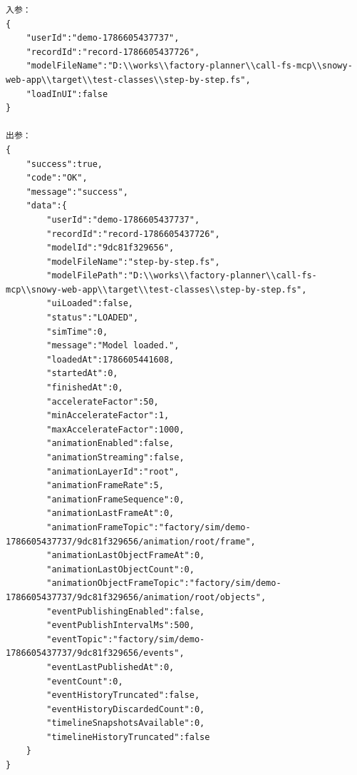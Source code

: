 {\scriptsize
\begin{verbatim}
入参：
{
	"userId":"demo-1786605437737",
	"recordId":"record-1786605437726",
	"modelFileName":"D:\\works\\factory-planner\\call-fs-mcp\\snowy-web-app\\target\\test-classes\\step-by-step.fs",
	"loadInUI":false
}    

出参：
{
	"success":true,
	"code":"OK",
	"message":"success",
	"data":{
		"userId":"demo-1786605437737",
		"recordId":"record-1786605437726",
		"modelId":"9dc81f329656",
		"modelFileName":"step-by-step.fs",
		"modelFilePath":"D:\\works\\factory-planner\\call-fs-mcp\\snowy-web-app\\target\\test-classes\\step-by-step.fs",
		"uiLoaded":false,
		"status":"LOADED",
		"simTime":0,
		"message":"Model loaded.",
		"loadedAt":1786605441608,
		"startedAt":0,
		"finishedAt":0,
		"accelerateFactor":50,
		"minAccelerateFactor":1,
		"maxAccelerateFactor":1000,
		"animationEnabled":false,
		"animationStreaming":false,
		"animationLayerId":"root",
		"animationFrameRate":5,
		"animationFrameSequence":0,
		"animationLastFrameAt":0,
		"animationFrameTopic":"factory/sim/demo-1786605437737/9dc81f329656/animation/root/frame",
		"animationLastObjectFrameAt":0,
		"animationLastObjectCount":0,
		"animationObjectFrameTopic":"factory/sim/demo-1786605437737/9dc81f329656/animation/root/objects",
		"eventPublishingEnabled":false,
		"eventPublishIntervalMs":500,
		"eventTopic":"factory/sim/demo-1786605437737/9dc81f329656/events",
		"eventLastPublishedAt":0,
		"eventCount":0,
		"eventHistoryTruncated":false,
		"eventHistoryDiscardedCount":0,
		"timelineSnapshotsAvailable":0,
		"timelineHistoryTruncated":false
	}
}
\end{verbatim}
}


